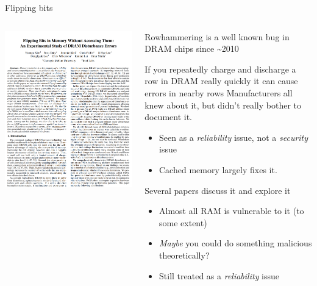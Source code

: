 \documentclass[9pt,aspectratio=169]{beamer}
\begin{document}
\begin{frame}[label={sec:org6fc911e}]{Flipping bits}
\begin{columns}
\begin{column}[t]{0.49\columnwidth}
\begin{center}
\includegraphics[width=.9\linewidth]{./flippingbits.png}
\end{center}
\end{column}

\begin{column}[t]{0.49\columnwidth}
Rowhammering is a well known bug in DRAM chips since \textasciitilde{}2010

\begin{block}{If you repeatedly charge and discharge a row in DRAM really quickly it can cause errors in nearby rows}
Manufacturers all knew about it, but didn't really bother to document it.
\begin{itemize}
\item Seen as a \emph{reliability} issue, not a \emph{security} issue
\item Cached memory largely fixes it.
\end{itemize}

Several papers discuss it and explore it
\begin{itemize}
\item Almost all RAM is vulnerable to it (to some extent)
\item \emph{Maybe} you could do something malicious theoretically?
\item Still treated as a \emph{reliability} issue
\end{itemize}
\end{block}
\end{column}
\end{columns}
\end{frame}
\end{document}
